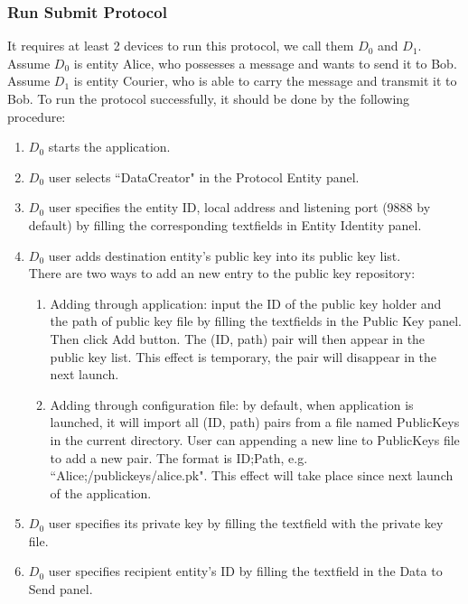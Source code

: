 \subsubsection{Run Submit Protocol}
It requires at least 2 devices to run this protocol, we call them $ D_0 $ and $ D_1 $. Assume $ D_0 $ is entity Alice, who possesses a message and wants to send it to Bob. Assume $ D_1 $ is entity Courier, who is able to carry the message and transmit it to Bob. To run the protocol successfully, it should be done by the following procedure:
\begin{enumerate}
\item $ D_0 $ starts the application.

\item $ D_0 $ user selects ``DataCreator" in the Protocol Entity panel.

\item $ D_0 $ user specifies the entity ID, local address and listening port (9888 by default) by filling the corresponding textfields in Entity Identity panel.

\item $ D_0 $ user adds destination entity's public key into its public key list.\\
There are two ways to add an new entry to the public key repository:
 \begin{enumerate}
 \item Adding through application: input the ID of the public key holder and the path of public key file by filling the textfields in the Public Key panel. Then click Add button. The (ID, path) pair will then appear in the public key list. This effect is temporary, the pair will disappear in the next launch.
 \item Adding through configuration file: by default, when application is launched, it will import all (ID, path) pairs from a file named PublicKeys in the current directory. User can appending a new line to PublicKeys file to add a new pair. The format is ID;Path, e.g. ``Alice;/publickeys/alice.pk". This effect will take place since next launch of the application.
 \end{enumerate}

\item $ D_0 $ user specifies its private key by filling the textfield with the private key file.

\item $ D_0 $ user specifies recipient entity's ID by filling the textfield in the Data to Send panel.


\end{enumerate}
